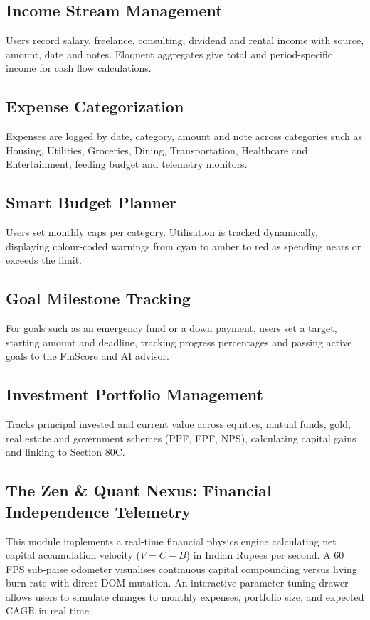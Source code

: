 \documentclass[12pt,a4paper]{report}
\begin{document}
\subsection{Income Stream Management}\label{s432}
Users record salary, freelance, consulting, dividend and rental income with source, amount, date and notes. Eloquent aggregates give total and period-specific income for cash flow calculations.

\subsection{Expense Categorization}\label{s433}
Expenses are logged by date, category, amount and note across categories such as Housing, Utilities, Groceries, Dining, Transportation, Healthcare and Entertainment, feeding budget and telemetry monitors.

\subsection{Smart Budget Planner}\label{s434}
Users set monthly caps per category. Utilisation is tracked dynamically, displaying colour-coded warnings from cyan to amber to red as spending nears or exceeds the limit.

\subsection{Goal Milestone Tracking}\label{s435}
For goals such as an emergency fund or a down payment, users set a target, starting amount and deadline, tracking progress percentages and passing active goals to the FinScore and AI advisor.

\subsection{Investment Portfolio Management}\label{s436}
Tracks principal invested and current value across equities, mutual funds, gold, real estate and government schemes (PPF, EPF, NPS), calculating capital gains and linking to Section 80C.

\subsection{The Zen \& Quant Nexus: Financial Independence Telemetry}\label{s437}
This module implements a real-time financial physics engine calculating net capital accumulation velocity ($V = C - B$) in Indian Rupees per second. A 60 FPS sub-paise odometer visualises continuous capital compounding versus living burn rate with direct DOM mutation. An interactive parameter tuning drawer allows users to simulate changes to monthly expenses, portfolio size, and expected CAGR in real time.
\end{document}
